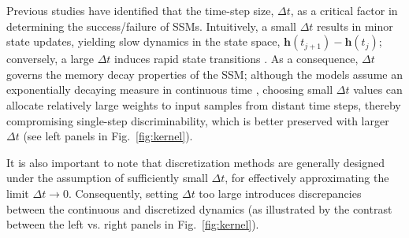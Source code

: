 \documentclass[10pt,letterpaper]{article}
\begin{document}

Previous studies have identified that the time-step size, $\Delta t$, as a critical factor in determining the success/failure of SSMs.
Intuitively, a small $\Delta t$ results in minor state updates, yielding slow dynamics in the state space, $\mathbf{h}(t_{j+1})-\mathbf{h}(t_{j})$;
conversely, a large $\Delta t$ induces rapid state transitions \citep{Gu+21,GuDao24}.
As a consequence, $\Delta t$ governs the memory decay properties of the SSM;
although the models assume an exponentially decaying measure in continuous time \citep[particularly when employing Legendre/Laguerre polynomials;][]{Gu+23_ICLR}, choosing small $\Delta t$ values can allocate relatively large weights to input samples from distant time steps, thereby compromising single-step discriminability, which is better preserved with larger $\Delta t$ (see left panels in Fig.~\ref{fig:kernel}).

It is also important to note that discretization methods are generally designed under the assumption of sufficiently small $\Delta t$, for effectively approximating the limit $\Delta t \to 0$.
Consequently, setting $\Delta t$ too large introduces discrepancies between the continuous and discretized dynamics (as illustrated by the contrast between the left vs. right panels in Fig.~\ref{fig:kernel}).
\end{document}
